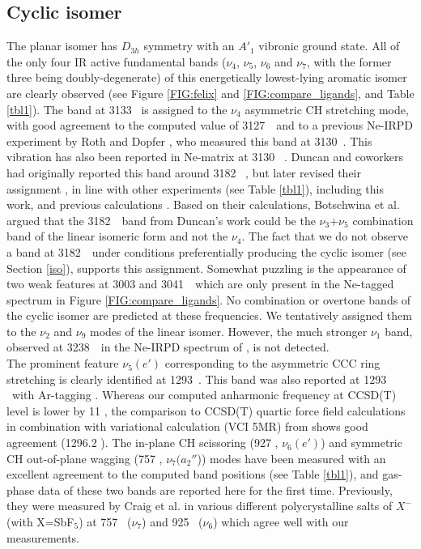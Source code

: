\subsection{Cyclic isomer}
\vspace{0.5cm}
\label{cyclic}
The planar \cyc isomer has $D_{3h}$ symmetry with an $A'_1$ vibronic ground state. All of the only four IR active fundamental bands ($\nu_4$, $\nu_5$, $\nu_6$ and $\nu_7$, with the former three being doubly-degenerate) of this energetically lowest-lying aromatic isomer are clearly observed (see Figure \ref{FIG:felix} and \ref{FIG:compare_ligands}, and Table \ref{tbl1}). The band at 3133 \wn\ is assigned to the $\nu_{4}$ asymmetric CH stretching mode, with good agreement to the computed value of 3127~\wn\ and to a previous Ne-IRPD experiment by Roth and Dopfer \cite{Roth2002}, who measured this band at 3130~\wnn. This vibration has also been reported in Ne-matrix at 3130 \wn\ \citep{Wyss2001}. Duncan and coworkers had originally  reported this band around 3182 \wn\ \citep{RDS2010}, but later revised their assignment \citep{Duncan2012}, in line with other experiments \citep{ZDL2014, Roth2002} (see Table \ref{tbl1}), including this work, and previous calculations \citep{BOR2011, HTL2011}. Based on their calculations, Botschwina et al. \citep{BOR2011} argued that the 3182~\wn\ band from Duncan's work could be the $\nu_3$+$\nu_5$ combination band of the linear isomeric form and not the $\nu_{4}$. The fact that we do not observe a band at 3182~\wn\ under conditions preferentially producing the cyclic isomer (see Section \ref{iso}), supports this assignment.
Somewhat puzzling is the appearance of two weak features at 3003 and 3041~\wn\, which are only present in the Ne-tagged spectrum in Figure \ref{FIG:compare_ligands}. No combination or overtone bands of the cyclic isomer are predicted at these frequencies. We tentatively assigned them to the $\nu_2$ and $\nu_9$ modes of the linear isomer. However, the much stronger $\nu_1$ band, observed at 3238~\wn\ in the Ne-IRPD spectrum of \citet{Botschwina2011}, is not detected.\\

The prominent feature $\nu_5(e')$ corresponding to the asymmetric CCC ring stretching is clearly identified at 1293~\wnn. This band was also reported at 1293 \wn\ with Ar-tagging \citep{RDS2010}. Whereas our computed anharmonic frequency at CCSD(T) level is lower by 11 \wnn, the comparison to CCSD(T) quartic force field calculations in combination with variational calculation (VCI 5MR) from \citet{HTL2011} shows good agreement (1296.2 \wnn). The in-plane CH scissoring (927 \wnn, $\nu_6(e')$) and symmetric CH out-of-plane wagging (757 \wnn, $\nu_7(a_2''$)) modes have been measured with an excellent agreement to the computed band positions (see Table \ref{tbl1}), and gas-phase data of these two bands are reported here for the first time. Previously, they were measured by Craig et al. \citep{Craig1986} in various different polycrystalline salts of \cycn $X^{-}$ (with X=SbF$_5$) at  757 \wn\ ($\nu_7$) and 925 \wn\ ($\nu_6$) which agree well with our measurements.\\

